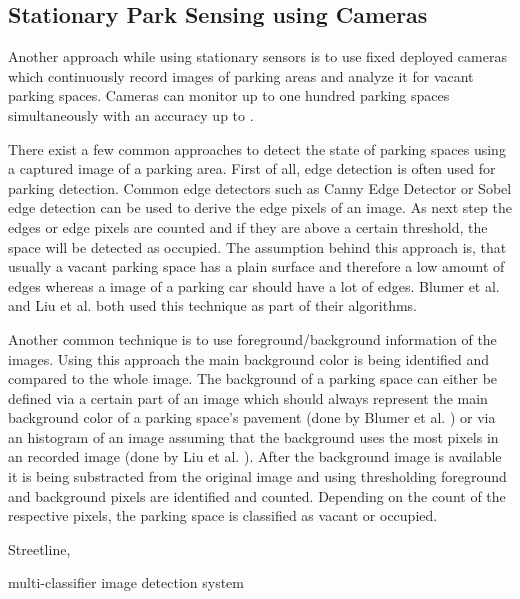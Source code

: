 




\subsection{Stationary Park Sensing using Cameras}
\label{sec:stationary_park_sensing_cameras}

Another approach while using stationary sensors is to use fixed deployed cameras which continuously record images of parking areas and analyze it for vacant parking spaces. Cameras can monitor up to one hundred parking spaces simultaneously with an accuracy up to .

There exist a few common approaches to detect the state of parking spaces using a captured image of a parking area. First of all, edge detection is often used for parking detection. Common edge detectors such as Canny Edge Detector or Sobel edge detection can be used to derive the edge pixels of an image. As next step the edges or edge pixels are counted and if they are above a certain threshold, the space will be detected as occupied. The assumption behind this approach is, that usually a vacant parking space has a plain surface and therefore a low amount of edges whereas a image of a parking car should have a lot of edges. Blumer et al. \cite{Blumer2012} and Liu et al. \cite{stationary_camera_sensing} both used this technique as part of their algorithms.

Another common technique is to use foreground/background information of the images. Using this approach the main background color is being identified and compared to the whole image. The background of a parking space can either be defined via a certain part of an image which should always represent the main background color of a parking space's pavement (done by Blumer et al. \cite{Blumer2012}) or via an histogram of an image assuming that the background uses the most pixels in an recorded image (done by Liu et al. \cite{stationary_camera_sensing}). After the background image is available it is being substracted from the original image and using thresholding foreground and background pixels are identified and counted. Depending on the count of the respective pixels, the parking space is classified as vacant or occupied.


 Streetline, 

\cite{Blumer2012}

multi-classifier image detection system\cite{stationary_camera_sensing}

